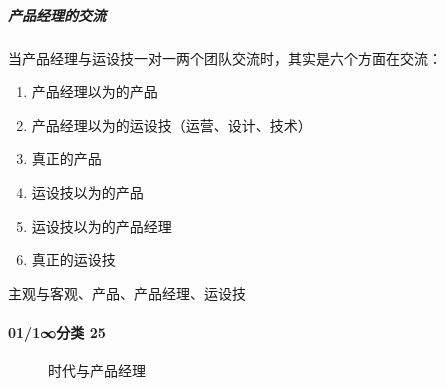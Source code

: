 \documentclass[letterpaper,10pt,english]{sphinxmanual}
\begin{document}
\subparagraph{产品经理的交流}
\label{\detokenize{chapter_introduction/PM:id33}}
当产品经理与运设技一对一两个团队交流时，其实是六个方面在交流：
\begin{enumerate}
%
\item {} 
产品经理以为的产品

\item {} 
产品经理以为的运设技（运营、设计、技术）

\item {} 
真正的产品

\item {} 
运设技以为的产品

\item {} 
运设技以为的产品经理

\item {} 
真正的运设技

\end{enumerate}

主观与客观、产品、产品经理、运设技


\paragraph{0\sphinxhyphen{}1/1\sphinxhyphen{}∞分类 25\sphinxfootnotemark[190]}
\label{\detokenize{chapter_introduction/PM:id34}}%
\begin{footnotetext}[190]\sphinxAtStartFootnote
{}
%
\end{footnotetext}\ignorespaces 
\begin{figure}[H]
\centering
\capstart

\noindent{}
\caption{时代与产品经理}\label{\detokenize{chapter_introduction/PM:id70}}\end{figure}

\begin{figure}[H]
\centering
\capstart

\noindent{}
\caption{\sphinxfootnotemark[191]}\label{\detokenize{chapter_introduction/PM:id71}}\end{figure}
%
\begin{footnotetext}[191]\sphinxAtStartFootnote
{}
%
\end{footnotetext}\ignorespaces 
\end{document}
